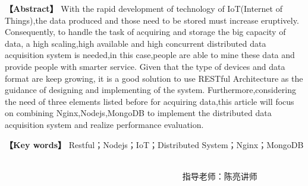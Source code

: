 

\renewcommand\abstractname{{\fontsize{18}{21.6} \selectfont Design and Implementation of IoT-Based Distributed Data Acquisition System}}

\begin{abstract}
\end{abstract}
{\noindent \fontsize{12}{14.4} \selectfont \textbf{【Abstract】}}
{\fontsize{10.5}{12.6} \selectfont
With the rapid development of technology of IoT(Internet of Things),the data produced and those need to be stored must increase eruptively. Consequently, to handle the task of acquiring and storage the big capacity of data, a high scaling,high available and high concurrent distributed data acquisition system is needed,in this case,people are able to mine these data and provide people with smarter service. Given that the type of devices and data format are keep growing, it is a good solution to use RESTful Architecture as the guidance of designing and implementing of the system. Furthermore,considering the need of three elements listed before for acquiring data,this article will focus on combining Nginx,Nodejs,MongoDB to implement the distributed data acquisition system and realize performance evaluation.
}

\vspace{1em}

{\noindent \fontsize{12}{14.4} \selectfont \textbf{【Key words】}}
{\fontsize{10.5}{12.6} \selectfont
Restful；Nodejs；IoT；Distributed System；Nginx；MongoDB\newline
\newline
}


~~~~~~~~~~~~~~~~~~~~~~~~~~~~~~~~~~~~~~~~~~~~~~~~~~~~~~~~~~~~~~~~~~~~~~~~~~~~~~~~~~~~~~~~~~~~~~~~~~~~~~~~~~~~~~~~~~ 指导老师：陈亮讲师

